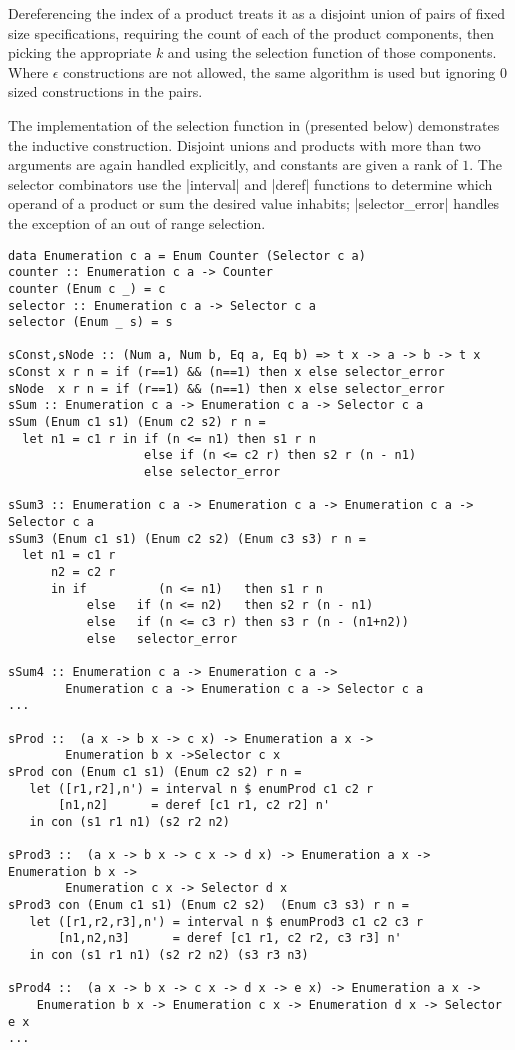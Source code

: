 \noindent
Dereferencing the index of a product treats it as a disjoint union of pairs of fixed size specifications,
requiring the count of each of the product components,
then picking the appropriate $k$ and using the selection function of those components.
Where $\epsilon$ constructions are not allowed,
the same algorithm is used but ignoring $0$ sized constructions in the pairs.

The implementation of the selection function in \GC (presented below)
demonstrates the inductive construction.
Disjoint unions and products with more than two arguments
are again handled explicitly,
and constants are given a rank of $1$.
The selector combinators use the |interval| and |deref| functions
to determine which operand of a product or sum the desired value inhabits;
|selector_error| handles the exception of an out of range selection.

\begin{lstlisting}
data Enumeration c a = Enum Counter (Selector c a)
counter :: Enumeration c a -> Counter
counter (Enum c _) = c
selector :: Enumeration c a -> Selector c a
selector (Enum _ s) = s

sConst,sNode :: (Num a, Num b, Eq a, Eq b) => t x -> a -> b -> t x
sConst x r n = if (r==1) && (n==1) then x else selector_error
sNode  x r n = if (r==1) && (n==1) then x else selector_error
sSum :: Enumeration c a -> Enumeration c a -> Selector c a
sSum (Enum c1 s1) (Enum c2 s2) r n = 
  let n1 = c1 r in if (n <= n1) then s1 r n 
                   else if (n <= c2 r) then s2 r (n - n1)
                   else selector_error

sSum3 :: Enumeration c a -> Enumeration c a -> Enumeration c a -> Selector c a
sSum3 (Enum c1 s1) (Enum c2 s2) (Enum c3 s3) r n = 
  let n1 = c1 r 
      n2 = c2 r
      in if          (n <= n1)   then s1 r n 
           else   if (n <= n2)   then s2 r (n - n1)
           else   if (n <= c3 r) then s3 r (n - (n1+n2))
           else   selector_error

sSum4 :: Enumeration c a -> Enumeration c a -> 
		Enumeration c a -> Enumeration c a -> Selector c a
...

sProd ::  (a x -> b x -> c x) -> Enumeration a x -> 
		Enumeration b x ->Selector c x
sProd con (Enum c1 s1) (Enum c2 s2) r n =
   let ([r1,r2],n') = interval n $ enumProd c1 c2 r
       [n1,n2]      = deref [c1 r1, c2 r2] n'
   in con (s1 r1 n1) (s2 r2 n2)

sProd3 ::  (a x -> b x -> c x -> d x) -> Enumeration a x -> Enumeration b x -> 
		Enumeration c x -> Selector d x
sProd3 con (Enum c1 s1) (Enum c2 s2)  (Enum c3 s3) r n =
   let ([r1,r2,r3],n') = interval n $ enumProd3 c1 c2 c3 r
       [n1,n2,n3]      = deref [c1 r1, c2 r2, c3 r3] n'
   in con (s1 r1 n1) (s2 r2 n2) (s3 r3 n3)

sProd4 ::  (a x -> b x -> c x -> d x -> e x) -> Enumeration a x -> 
    Enumeration b x -> Enumeration c x -> Enumeration d x -> Selector e x
...

\end{lstlisting}


